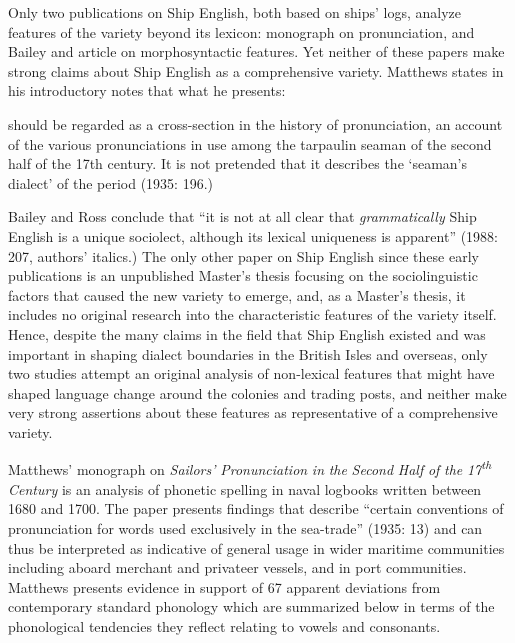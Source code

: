 Only two publications on Ship English, both based on ships’ logs, analyze features of the variety beyond its lexicon: \citet{Matthews1935} monograph on pronunciation, and Bailey and  article on morphosyntactic features. Yet neither of these papers make strong claims about Ship English as a comprehensive variety. Matthews states in his introductory notes that what he presents:

should be regarded as a cross-section in the history of pronunciation, an account of the various pronunciations in use among the tarpaulin seaman of the second half of the 17th century. It is not pretended that it describes the ‘seaman’s dialect’ of the period (1935: 196.)

Bailey and Ross conclude that “it is not at all clear that \textit{grammatically} Ship English is a unique sociolect, although its lexical uniqueness is apparent” (1988: 207, authors’ italics.) The only other paper on Ship English since these early publications is an unpublished Master’s thesis \citep{Schultz2010} focusing on the sociolinguistic factors that caused the new variety to emerge, and, as a Master’s thesis, it includes no original research into the characteristic features of the variety itself. Hence, despite the many claims in the field that Ship English existed and was important in shaping dialect boundaries in the British Isles and overseas, only two studies attempt an original analysis of non-lexical features that might have shaped language change around the colonies and trading posts, and neither make very strong assertions about these features as representative of a comprehensive variety.  

Matthews’ monograph on \textit{Sailors’} \textit{Pronunciation} \textit{in} \textit{the} \textit{Second} \textit{Half} \textit{of} \textit{the} \textit{17\textsuperscript{th}} \textit{Century} is an analysis of phonetic spelling in naval logbooks written between 1680 and 1700. The paper presents findings that describe “certain conventions of pronunciation for words used exclusively in the sea-trade” (1935: 13) and can thus be interpreted as indicative of general usage in wider maritime communities including aboard merchant and privateer vessels, and in port communities. Matthews presents evidence in support of 67 apparent deviations from contemporary standard phonology which are summarized below in terms of the phonological tendencies they reflect relating to vowels and consonants. 

